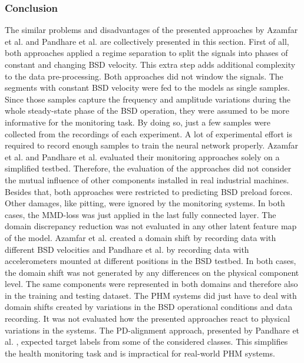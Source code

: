 \subsubsection{Conclusion}
The similar problems and disadvantages of the presented approaches by Azamfar et al. \cite{AZAMFAR2020103932} and Pandhare et al. \cite{Pandhare2021} are collectively presented in this section. First of all, both approaches applied a regime separation to split the signals into phases of constant and changing BSD velocity. This extra step adds additional complexity to the data pre-processing. Both approaches did not window the signals. The segments with constant BSD velocity were fed to the models as single samples. Since those samples capture the frequency and amplitude variations during the whole steady-state phase of the BSD operation, they were assumed to be more informative for the monitoring task. By doing so, just a few samples were collected from the recordings of each experiment. A lot of experimental effort is required to record enough samples to train the neural network properly. Azamfar et al. \cite{AZAMFAR2020103932} and  Pandhare et al. \cite{Pandhare2021} evaluated their monitoring approaches solely on a simplified testbed. Therefore, the evaluation of the approaches did not consider the mutual influence of other components installed in real industrial machines. Besides that, both approaches were restricted to predicting BSD preload forces. Other damages, like pitting, were ignored by the monitoring systems. In both cases, the MMD-loss was just applied in the last fully connected layer. The domain discrepancy reduction was not evaluated in any other latent feature map of the model. Azamfar et al. \cite{AZAMFAR2020103932} created a domain shift by recording data with different BSD velocities and Pandhare et al. \cite{Pandhare2021} by recording data with accelerometers mounted at different positions in the BSD testbed. In both cases, the domain shift was not generated by any differences on the physical component level. The same components were represented in both domains and therefore also in the training and testing dataset. The PHM systems did just have to deal with domain shifts created by variations in the BSD operational conditions and data recording. It was not evaluated how the presented approaches react to physical variations in the systems. The PD-alignment approach, presented by Pandhare et al. \cite{Pandhare2021}, expected target labels from some of the considered classes. This simplifies the health monitoring task and is impractical for real-world PHM systems.


